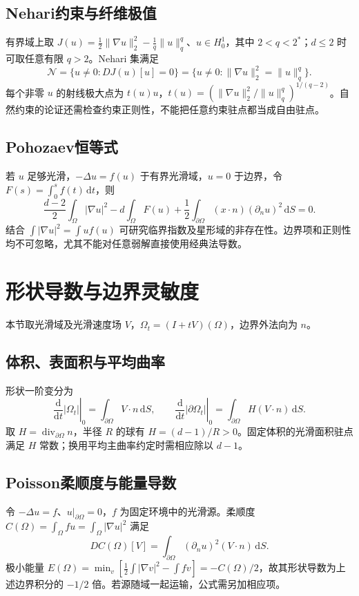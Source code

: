 \documentclass[../main.tex]{subfiles}
\begin{document}
\subsection{Nehari约束与纤维极值}
有界域上取 $J(u)=\frac12\|\nabla u\|_2^2-\frac1q\|u\|_q^q$、$u\in H_0^1$，其中 $2<q<2^*$；$d\le2$ 时可取任意有限 $q>2$。Nehari 集满足
\[
\mathcal N=\{u\ne0:DJ(u)[u]=0\}
=\{u\ne0:\|\nabla u\|_2^2=\|u\|_q^q\}.
\]
每个非零 $u$ 的射线极大点为 $t(u)u$，$t(u)=(\|\nabla u\|_2^2/\|u\|_q^q)^{1/(q-2)}$。自然约束的论证还需检查约束正则性，不能把任意约束驻点都当成自由驻点。
\subsection{Pohozaev恒等式}
若 $u$ 足够光滑，$-\Delta u=f(u)$ 于有界光滑域，$u=0$ 于边界，令 $F(s)=\int_0^sf(t)\,\mathrm dt$，则
\[
\frac{d-2}2\int_\Omega|\nabla u|^2-d\int_\Omega F(u)
+\frac12\int_{\partial\Omega}(x\cdot n)(\partial_nu)^2\,\mathrm dS=0.
\]
结合 $\int|\nabla u|^2=\int u f(u)$ 可研究临界指数及星形域的非存在性。边界项和正则性均不可忽略，尤其不能对任意弱解直接使用经典法导数。
\section{形状导数与边界灵敏度}
本节取光滑域及光滑速度场 $V$，$\Omega_t=(I+tV)(\Omega)$，边界外法向为 $n$。
\subsection{体积、表面积与平均曲率}
形状一阶变分为
\[
\left.\frac{\mathrm d}{\mathrm dt}|\Omega_t|\right|_0=\int_{\partial\Omega}V\cdot n\,\mathrm dS,
\qquad
\left.\frac{\mathrm d}{\mathrm dt}|\partial\Omega_t|\right|_0
=\int_{\partial\Omega}H(V\cdot n)\,\mathrm dS.
\]
取 $H=\operatorname{div}_{\partial\Omega}n$，半径 $R$ 的球有 $H=(d-1)/R>0$。固定体积的光滑面积驻点满足 $H$ 常数；换用平均主曲率约定时需相应除以 $d-1$。
\subsection{Poisson柔顺度与能量导数}
令 $-\Delta u=f$、$u|_{\partial\Omega}=0$，$f$ 为固定环境中的光滑源。柔顺度 $C(\Omega)=\int_\Omega fu=\int_\Omega|\nabla u|^2$ 满足
\[
DC(\Omega)[V]=\int_{\partial\Omega}(\partial_nu)^2(V\cdot n)\,\mathrm dS.
\]
极小能量 $E(\Omega)=\min_v[\frac12\int|\nabla v|^2-\int fv]=-C(\Omega)/2$，故其形状导数为上述边界积分的 $-1/2$ 倍。若源随域一起运输，公式需另加相应项。
\end{document}
